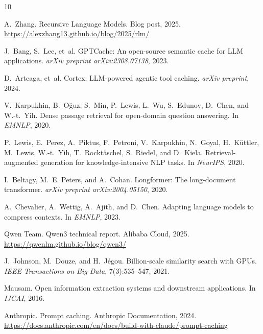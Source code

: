 \documentclass[11pt,twocolumn]{article}
\begin{document}
\begin{thebibliography}{10}

A.~Zhang.
\newblock Recursive Language Models.
\newblock Blog post, 2025.
\newblock \url{https://alexzhang13.github.io/blog/2025/rlm/}

J.~Bang, S.~Lee, et~al.
\newblock GPTCache: An open-source semantic cache for LLM applications.
\newblock \textit{arXiv preprint arXiv:2308.07138}, 2023.

D.~Arteaga, et~al.
\newblock Cortex: LLM-powered agentic tool caching.
\newblock \textit{arXiv preprint}, 2024.

V.~Karpukhin, B.~O\u{g}uz, S.~Min, P.~Lewis, L.~Wu, S.~Edunov, D.~Chen, and W.-t.~Yih.
\newblock Dense passage retrieval for open-domain question answering.
\newblock In \textit{EMNLP}, 2020.

P.~Lewis, E.~Perez, A.~Piktus, F.~Petroni, V.~Karpukhin, N.~Goyal, H.~K\"{u}ttler, M.~Lewis, W.-t.~Yih, T.~Rockt\"{a}schel, S.~Riedel, and D.~Kiela.
\newblock Retrieval-augmented generation for knowledge-intensive NLP tasks.
\newblock In \textit{NeurIPS}, 2020.

I.~Beltagy, M.~E. Peters, and A.~Cohan.
\newblock Longformer: The long-document transformer.
\newblock \textit{arXiv preprint arXiv:2004.05150}, 2020.

A.~Chevalier, A.~Wettig, A.~Ajith, and D.~Chen.
\newblock Adapting language models to compress contexts.
\newblock In \textit{EMNLP}, 2023.

Qwen Team.
\newblock Qwen3 technical report.
\newblock Alibaba Cloud, 2025.
\newblock \url{https://qwenlm.github.io/blog/qwen3/}

J.~Johnson, M.~Douze, and H.~J\'egou.
\newblock Billion-scale similarity search with GPUs.
\newblock \textit{IEEE Transactions on Big Data}, 7(3):535--547, 2021.

Mausam.
\newblock Open information extraction systems and downstream applications.
\newblock In \textit{IJCAI}, 2016.

Anthropic.
\newblock Prompt caching.
\newblock Anthropic Documentation, 2024.
\newblock \url{https://docs.anthropic.com/en/docs/build-with-claude/prompt-caching}

\end{thebibliography}
\end{document}
